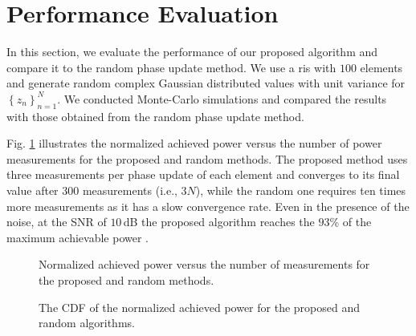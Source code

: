 \documentclass[conference]{IEEEtran}
\begin{document}
    



\section{Performance Evaluation}\label{sec:NumResults}
In this section, we evaluate the performance of our proposed algorithm and compare it to the random phase update method. We use a \gls*{ris} with $100$ elements and generate random complex Gaussian distributed values with unit variance for $\left\{z_n\right\}_{n=1}^N$. We conducted Monte-Carlo simulations and compared the results with those obtained from the random phase update method.

Fig. \ref{fig:Mean_vs_measurements} illustrates the normalized achieved power versus the number of power measurements for the proposed and random methods. The proposed method uses three measurements per phase update of each element and converges to its final value after $300$ measurements (i.e., $3N$), while the random one requires ten times more measurements as it has a slow convergence rate. Even in the presence of the noise, at the SNR of $10$\,dB the proposed algorithm reaches the $93$\% of the maximum achievable power \cite{MTavana_Tcom_2023}.


\begin{figure}
    \centering
    
    \caption{Normalized achieved power versus the number of measurements for the proposed and random methods.}
    \label{fig:Mean_vs_measurements}
\end{figure}


\begin{figure}
    \vspace{-2.25mm}
    \centering
    
    \caption{The CDF of the normalized achieved power for the proposed and random algorithms.}
    \label{fig:CDF_proposed}
\end{figure}
\end{document}
